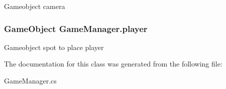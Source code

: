 Gameobject camera 

\hypertarget{classGameManager_abe8e79771775bc67c63c4ac43349dc8a}{
\subsubsection[{player}]{\setlength{\rightskip}{0pt plus 5cm}Game\-Object Game\-Manager.\-player}}\label{classGameManager_abe8e79771775bc67c63c4ac43349dc8a}


Gameobject spot to place player 



The documentation for this class was generated from the following file\-:\begin{DoxyCompactItemize}
\item 
Game\-Manager.\-cs\end{DoxyCompactItemize}
